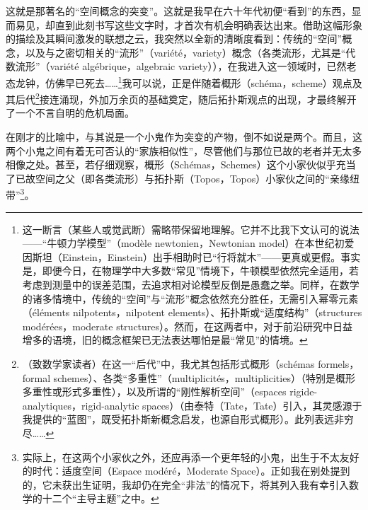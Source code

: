 这就是那著名的“空间概念的突变”。这就是我早在六十年代初便“看到”的东西，显而易见，却直到此刻书写这些文字时，才首次有机会明确表达出来。借助这幅形象的描绘及其瞬间激发的联想之云，我突然以全新的清晰度看到：传统的“空间”概念，以及与之密切相关的“流形”（variété，variety）概念（各类流形，尤其是“代数流形”（variété algébrique，algebraic variety）），在我进入这一领域时，已然老态龙钟，仿佛早已死去……\footnote{这一断言（某些人或觉武断）需略带保留地理解。它并不比我下文认可的说法——“牛顿力学模型”（modèle newtonien，Newtonian model）在本世纪初爱因斯坦（Einstein，Einstein）出手相助时已“行将就木”——更真或更假。事实是，即便今日，在物理学中大多数“常见”情境下，牛顿模型依然完全适用，若考虑到测量中的误差范围，去追求相对论模型反倒是愚蠢之举。同样，在数学的诸多情境中，传统的“空间”与“流形”概念依然充分胜任，无需引入幂零元素（éléments nilpotents，nilpotent elements）、拓扑斯或“适度结构”（structures modérées，moderate structures）。然而，在这两者中，对于前沿研究中日益增多的语境，旧的概念框架已无法表达哪怕是最“常见”的情境。}我可以说，正是伴随着概形（schéma，scheme）观点及其后代\footnote{（致数学家读者）在这一“后代”中，我尤其包括形式概形（schémas formels，formal schemes）、各类“多重性”（multiplicités，multiplicities）（特别是概形多重性或形式多重性），以及所谓的“刚性解析空间”（espaces rigide-analytiques，rigid-analytic spaces）（由泰特（Tate，Tate）引入，其灵感源于我提供的“蓝图”，既受拓扑斯新概念启发，也源自形式概形）。此列表远非穷尽……}接连涌现，外加万余页的基础奠定，随后拓扑斯观点的出现，才最终解开了一个不言自明的危机局面。

在刚才的比喻中，与其说是一个小鬼作为突变的产物，倒不如说是两个。而且，这两个小鬼之间有着无可否认的“家族相似性”，尽管他们与那位已故的老者并无太多相像之处。甚至，若仔细观察，概形（Schémas，Schemes）这个小家伙似乎充当了已故空间之父（即各类流形）与拓扑斯（Topos，Topos）小家伙之间的“亲缘纽带”\footnote{实际上，在这两个小家伙之外，还应再添一个更年轻的小鬼，出生于不太友好的时代：适度空间（Espace modéré，Moderate Space）。正如我在别处提到的，它未获出生证明，我却仍在完全“非法”的情况下，将其列入我有幸引入数学的十二个“主导主题”之中。}。